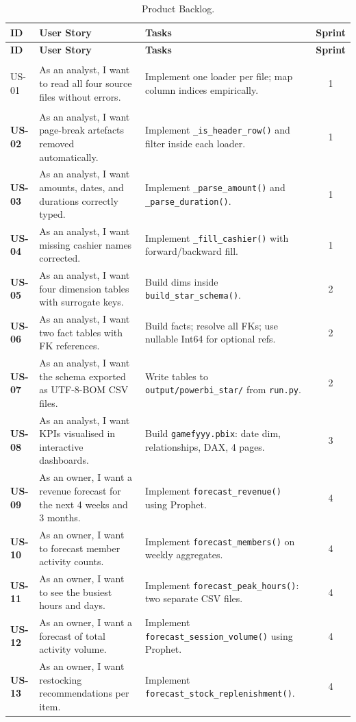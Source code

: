\documentclass[12pt, a4paper]{report}
\begin{document}
\begin{longtable}{>{\bfseries}p{1.4cm} p{4.3cm} p{5.3cm} c}
  \caption{Product Backlog.\label{tab:backlog}} \\
  \toprule
  \textbf{ID} & \textbf{User Story} & \textbf{Tasks} & \textbf{Sprint} \\
  \midrule
  \endfirsthead
  \toprule
  \textbf{ID} & \textbf{User Story} & \textbf{Tasks} & \textbf{Sprint} \\
  \midrule
  \endhead
  \bottomrule
  \endfoot

  US-01 & As an analyst, I want to read all four source files without errors.
        & Implement one loader per file; map column indices empirically.
        & 1 \\[3pt]
  US-02 & As an analyst, I want page-break artefacts removed automatically.
        & Implement \texttt{\_is\_header\_row()} and filter inside each loader.
        & 1 \\[3pt]
  US-03 & As an analyst, I want amounts, dates, and durations correctly typed.
        & Implement \texttt{\_parse\_amount()} and \texttt{\_parse\_duration()}.
        & 1 \\[3pt]
  US-04 & As an analyst, I want missing cashier names corrected.
        & Implement \texttt{\_fill\_cashier()} with forward/backward fill.
        & 1 \\[3pt]
  US-05 & As an analyst, I want four dimension tables with surrogate keys.
        & Build dims inside \texttt{build\_star\_schema()}.
        & 2 \\[3pt]
  US-06 & As an analyst, I want two fact tables with FK references.
        & Build facts; resolve all FKs; use nullable Int64 for optional refs.
        & 2 \\[3pt]
  US-07 & As an analyst, I want the schema exported as UTF-8-BOM CSV files.
        & Write tables to \texttt{output/powerbi\_star/} from \texttt{run.py}.
        & 2 \\[3pt]
  US-08 & As an analyst, I want KPIs visualised in interactive dashboards.
        & Build \texttt{gamefyyy.pbix}: date dim, relationships, DAX, 4 pages.
        & 3 \\[3pt]
  US-09 & As an owner, I want a revenue forecast for the next 4 weeks and 3 months.
        & Implement \texttt{forecast\_revenue()} using Prophet.
        & 4 \\[3pt]
  US-10 & As an owner, I want to forecast member activity counts.
        & Implement \texttt{forecast\_members()} on weekly aggregates.
        & 4 \\[3pt]
  US-11 & As an owner, I want to see the busiest hours and days.
        & Implement \texttt{forecast\_peak\_hours()}: two separate CSV files.
        & 4 \\[3pt]
  US-12 & As an owner, I want a forecast of total activity volume.
        & Implement \texttt{forecast\_session\_volume()} using Prophet.
        & 4 \\[3pt]
  US-13 & As an owner, I want restocking recommendations per item.
        & Implement \texttt{forecast\_stock\_replenishment()}.
        & 4 \\[3pt]
\end{longtable}
\end{document}
